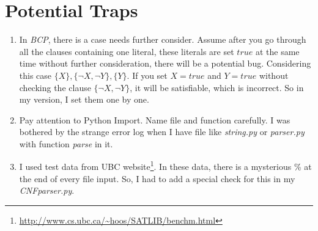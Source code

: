 \documentclass[a4paper,10pt]{article}
\begin{document}
\section{Potential Traps}
\begin{enumerate}
\setlength{\itemsep}{.1em}
\item In \textit{BCP}, there is a case needs further consider. Assume after you go through
    all the clauses containing one literal, these literals are set $true$ at
    the same time without further consideration, there will be a potential bug.
    Considering this case $\{X\},\{\neg X,\neg Y\},\{Y\}$. If you set $X=true$ and $Y=true$
    without checking the clause $\{\neg X,\neg Y\}$, it will be satisfiable, which is
    incorrect. So in my version, I set them one by one.
\item Pay attention to Python Import. Name file and function carefully.
    I was bothered by the strange error log
    when I have file like \textit{string.py} or \textit{parser.py}
    with function \textit{parse} in it.
\item I used test data from UBC 
    website\footnote{\url{http://www.cs.ubc.ca/~hoos/SATLIB/benchm.html}}.
    In these data, there is a mysterious \% at the end of every file input.
    So, I had to add a special check for this in my \textit{CNFparser.py}.
\end{enumerate}
\end{document}
